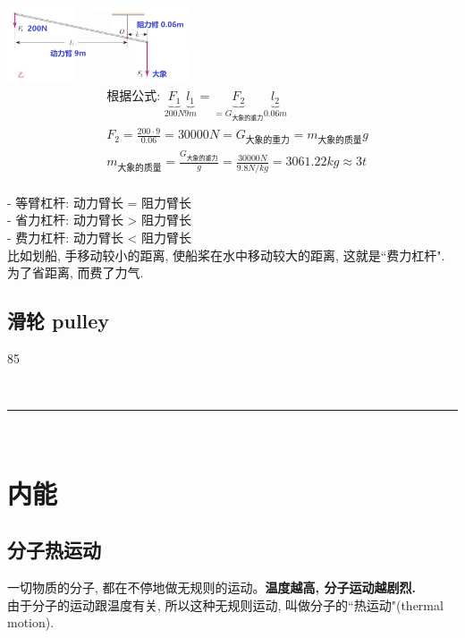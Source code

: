 \documentclass[UTF8]{ctexart}
\begin{document}
	
	
	\begin{tcolorbox}[title = {例},boxrule={0.1em},colframe={black!10}, colback={black!3},colbacktitle={black!10},coltitle={black}]
	\includegraphics[width=0.4\textwidth]{img/0049.png}	
	\begin{align*}
			& \text{根据公式:\ }\underset{200N}{\underbrace{F_1}}\underset{9m}{\underbrace{l_1}}=\underset{=G_{\text{大象的重力}}}{\underbrace{F_2}}\underset{0.06m}{\underbrace{l_2}}\\
		& F_2=\frac{200\cdot 9}{0.06}=30000N=G_{\text{大象的重力}}=m_{\text{大象的质量}}g\\
		& m_{\text{大象的质量}}=\frac{G_{\text{大象的重力}}}{g}=\frac{30000N}{9.8N/kg}=3061.22kg\approx 3t\\		
	\end{align*}
	\end{tcolorbox}
	
	
	- 等臂杠杆: 动力臂长 = 阻力臂长 \\
	- 省力杠杆: 动力臂长 > 阻力臂长 \\
	- 费力杠杆: 动力臂长 < 阻力臂长 \\
	比如划船, 手移动较小的距离, 使船桨在水中移动较大的距离, 这就是``费力杠杆". 为了省距离, 而费了力气.
	
	
	\vspace{1em} 
	
	
	\subsection{滑轮 pulley}
	
	85
	
	
	~\\
	\hrule
	~\\
	
	\section{内能}
	
	\subsection{分子热运动}
	
	一切物质的分子, 都在不停地做无规则的运动。\textbf{温度越高, 分子运动越剧烈.} \\
	由于分子的运动跟温度有关, 所以这种无规则运动, 叫做分子的``热运动"(thermal motion). \\
	
\end{document}
